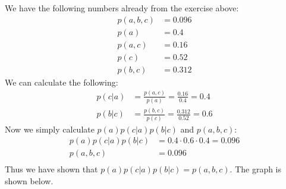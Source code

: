 We have the following numbers already from the exercise above:
\begin{align*}
  p(a,b,c) &= 0.096 \\
  p(a) &= 0.4 \\
  p(a,c) &= 0.16 \\
  p(c) &= 0.52 \\
  p(b,c) &= 0.312
\end{align*}
We can calculate the following:
\begin{align*}
  p(c|a) &= \frac{p(a,c)}{p(a)} = \frac{0.16}{0.4} = 0.4 \\
  p(b|c) &= \frac{p(b,c)}{p(c)} = \frac{0.312}{0.52} = 0.6
\end{align*}
Now we simply calculate $p(a)p(c|a)p(b|c)$ and $p(a,b,c)$:
\begin{align*}
  p(a)p(c|a)p(b|c) &= 0.4 \cdot 0.6 \cdot 0.4 = 0.096 \\
  p(a,b,c) &= 0.096 \\
\end{align*}
Thus we have shown that $p(a)p(c|a)p(b|c) = p(a,b,c)$. The graph is shown below.\\
